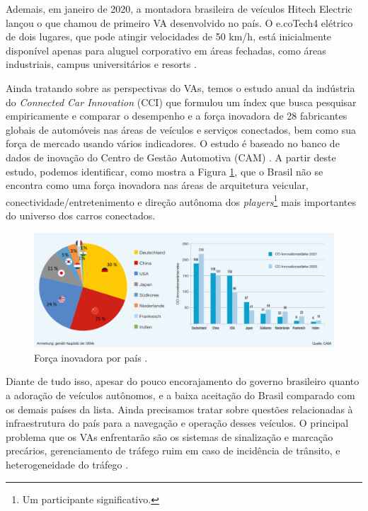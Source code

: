 Ademais, em janeiro de 2020, a montadora brasileira de veículos Hitech Electric lançou o que chamou de primeiro VA desenvolvido no país. O e.coTech4 elétrico de dois lugares, que pode atingir velocidades de 50 km/h, está inicialmente disponível apenas para aluguel corporativo em áreas fechadas, como áreas industriais, campus universitários e resorts \cite{KPMG}.

Ainda tratando sobre as perspectivas do VAs, temos o estudo anual da indústria do \textit{Connected Car Innovation} (CCI) que formulou um índex que busca pesquisar empiricamente e comparar o desempenho e a força inovadora de 28 fabricantes globais de automóveis nas áreas de veículos e serviços conectados, bem como sua força de mercado usando vários indicadores. O estudo é baseado no banco de dados de inovação do Centro de Gestão Automotiva (CAM) \cite{CCI}. A partir deste estudo, podemos identificar, como mostra a Figura \ref{forcaCCI}, que o Brasil não se encontra como uma força inovadora nas áreas de arquitetura veicular, conectividade/entretenimento e direção autônoma dos \textit{players}\footnote{Um participante significativo.} mais importantes do universo dos carros conectados.
\begin{figure}[H]
\centering
\includegraphics[width=12cm]{Figures/CCI.jpg}
\caption{Força inovadora por país  \cite{CCI}.}
\label{forcaCCI}
\end{figure}
Diante de tudo isso, apesar do pouco encorajamento do governo brasileiro quanto a adoração de veículos autônomos, e a baixa aceitação do Brasil comparado com os demais países da lista. Ainda precisamos tratar sobre questões relacionadas à infraestrutura do país para a navegação e operação desses veículos. 
O principal problema que os VAs enfrentarão são os sistemas de sinalização e marcação precários, gerenciamento de tráfego ruim em caso de incidência de trânsito, e heterogeneidade do tráfego \cite{mundobrasil}.

